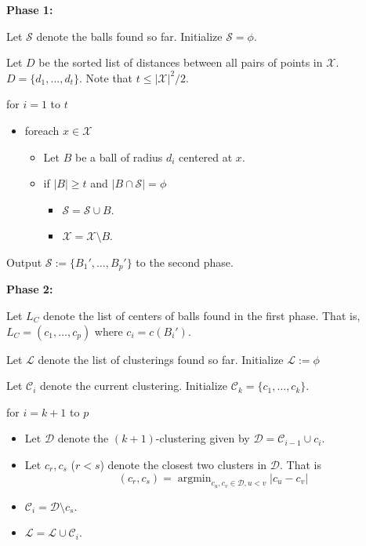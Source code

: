 \documentclass[twoside]{article}
\newcommand{\mc}{\mathcal}
\newenvironment{alg}{
    \begin{list}{}{
        \setlength{\itemsep}{2pt}
        \setlength{\parsep}{0pt}
        \setlength{\parskip}{0pt}
        \setlength{\topsep}{1pt}
    }
}
{
    \end{list}
}
\DeclareMathOperator{\argmin}{argmin}
\begin{document}
\begin{algorithm}
\begin{alg}
\item[] \textbf{Phase 1:}
\item[] Let $\mc S$ denote the balls found so far. Initialize $\mc S = \phi$.
\item[] Let $D$ be the sorted list of distances between all pairs of points in $\mc X$. $D = \{d_1,\ldots,d_t\}$. Note that $t \le |\mc X|^2/2$.
\item[] for $i=1$ to $t$
\begin{itemize}
\item[] foreach $x \in \mc X$
\begin{itemize}
\item[] Let $B$ be a ball of radius $d_i$ centered at $x$.
\item[] if $|B| \ge t$ and $|B \cap \mathcal{S} | = \phi$
\begin{itemize}
\item[] $\mathcal{S} = \mathcal{S} \cup B$. 
\item[] $\mc X = \mc X\setminus B$.
\end{itemize}
\end{itemize}
\end{itemize}
\item[] Output $\mc S := \{B_1',\ldots,B_p'\}$ to the second phase.

\item[] \textbf{Phase 2:}
\item[] Let $L_C$ denote the list of centers of balls found in the first phase. That is, $L_C = (c_1,\ldots,c_p)$ where $c_i = c(B_i')$.
\item[] Let $\mc L$ denote the list of clusterings found so far. Initialize $\mc L := \phi$
\item[] Let $\mc C_i$ denote the current clustering. Initialize $\mc C_k = \{c_1,\ldots,c_k\}$.
\item[] for $i=k+1$ to $p$
\begin{itemize}
\item[] Let $\mc D$ denote the $(k+1)$-clustering given by $\mc D = \mc C_{i-1} \cup c_i$. 
\item[] Let $c_r, c_s$ ($r < s$) denote the closest two clusters in $\mc D$. That is $$(c_r, c_s) = \argmin_{c_u,c_v \in \mc D, u < v} |c_u -c_v|$$
\item[] $\mc C_i = \mc D \setminus c_s$.
\item[] $\mc L = \mc L \cup \mc C_i$.


\end{itemize}
\end{alg}
\end{algorithm}
\end{document}
